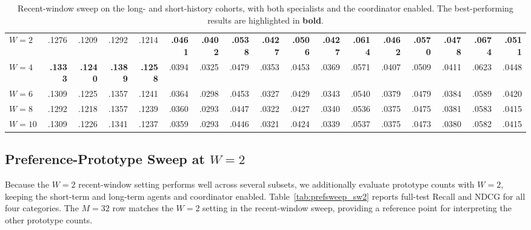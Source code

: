 ﻿\documentclass[sigconf,anonymous,review]{acmart}
\begin{document}
\begin{table}[!tbp]
{\begin{tabular}{l*{4}{rrrr}}
        $W=2$ & .1276 & .1209 & .1292 & .1214 & \textbf{.0461} & \textbf{.0402} & \textbf{.0538} & \textbf{.0427} & \textbf{.0506} & \textbf{.0427} & \textbf{.0614} & \textbf{.0462} & \textbf{.0570} & \textbf{.0478} & \textbf{.0674} & \textbf{.0511} \\
        $W=4$ & \textbf{.1333} & \textbf{.1240} & \textbf{.1389} & \textbf{.1258} & .0394 & .0325 & .0479 & .0353 & .0453 & .0369 & .0571 & .0407 & .0509 & .0411 & .0623 & .0448 \\
        $W=6$ & .1309 & .1225 & .1357 & .1241 & .0364 & .0298 & .0453 & .0327 & .0429 & .0343 & .0540 & .0379 & .0479 & .0384 & .0589 & .0420 \\
        $W=8$ & .1292 & .1218 & .1357 & .1239 & .0360 & .0293 & .0447 & .0322 & .0427 & .0340 & .0536 & .0375 & .0475 & .0381 & .0583 & .0415 \\
        $W=10$ & .1309 & .1226 & .1341 & .1237 & .0359 & .0293 & .0446 & .0321 & .0424 & .0339 & .0537 & .0375 & .0473 & .0380 & .0582 & .0415 \\
        \bottomrule
    \end{tabular}%
    }
    \caption{Recent-window sweep on the long- and short-history cohorts, with both specialists and the coordinator enabled. The best-performing results are highlighted in \textbf{bold}.}
    \label{tab:short_window_cohorts}
    \vspace{-0.3cm}
\end{table}

\subsection{Preference-Prototype Sweep at $W=2$}

\label{app:sw2_prototype_sweep}

Because the $W=2$ recent-window setting performs well across several subsets, we additionally evaluate prototype counts with $W=2$, keeping the short-term and long-term agents and coordinator enabled. Table~\ref{tab:prefsweep_sw2} reports full-test Recall and NDCG for all four categories. The $M=32$ row matches the $W=2$ setting in the recent-window sweep, providing a reference point for interpreting the other prototype counts.
\end{document}
